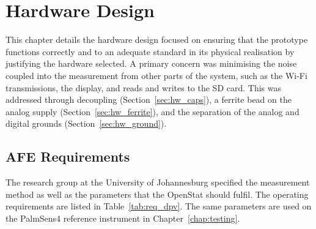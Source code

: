 
\providecommand{\capstack}{}
\renewcommand{\capstack}[1]{\begin{tabular}[c]{@{}l@{}}#1\end{tabular}}

\chapter{Hardware Design}
\label{chap:hardware_design}

This chapter details the hardware design focused on ensuring that the prototype functions correctly and to an adequate standard in its physical realisation by justifying the hardware selected. A primary concern was minimising the noise coupled into the measurement from other parts of the system, such as the Wi-Fi transmissions, the display, and reads and writes to the SD card. This was addressed through decoupling (Section~\ref{sec:hw_caps}), a ferrite bead on
the analog supply (Section~\ref{sec:hw_ferrite}), and the separation of the analog and
digital grounds (Section~\ref{sec:hw_ground}).

\section{AFE Requirements}
\label{sec:requirements}
 
The research group at the University of Johannesburg \cite{ebrahim_dpv_conditions} specified the measurement method as well as the parameters that the OpenStat should fulfil. The operating requirements are listed in Table~\ref{tab:req_dpv}. The same parameters are used on the PalmSens4
reference instrument in Chapter~\ref{chap:testing}.
 

